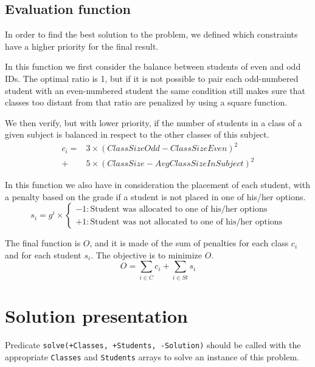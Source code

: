 \documentclass[runningheads]{llncs}
\begin{document}
\subsection{Evaluation function}

In order to find the best solution to the problem, we defined which constraints have a higher priority for the final result.

In this function we first consider the balance between students of even and odd IDs. The optimal ratio is 1, but if it is not possible to pair each odd-numbered student with an even-numbered student the same condition still makes sure that classes too distant from that ratio are penalized by using a square function. 

We then verify, but with lower priority, if the number of students in a class of a given subject is balanced in respect to the other classes of this subject.
\begin{equation}
\begin{aligned}
    c_i = & 3 \times \left(ClassSizeOdd - ClassSizeEven\right)^2 \\
        + & 5 \times \left(ClassSize - AvgClassSizeInSubject\right)^2
\end{aligned}
\end{equation}

In this function we also have in consideration the placement of each student, with a penalty based on the grade if a student is not placed in one of his/her options.
\begin{equation}
    s_i = g^i \times \begin{cases}
        -1 : \text{Student was allocated to one of his/her options} \\
        +1 : \text{Student was not allocated to one of his/her options}
    \end{cases}
\end{equation}

The final function is $O$, and it is made of the sum of penalties for each class $c_i$ and for each student $s_i$. The objective is to minimize $O$.
\begin{equation} 
    O = \sum_{i \in C}{c_i} + \sum_{i \in St}{s_i}
\end{equation}

\section{Solution presentation}

Predicate \texttt{solve(+Classes, +Students, -Solution)} should be called with the appropriate \texttt{Classes} and \texttt{Students} arrays to solve an instance of this problem.
\end{document}
